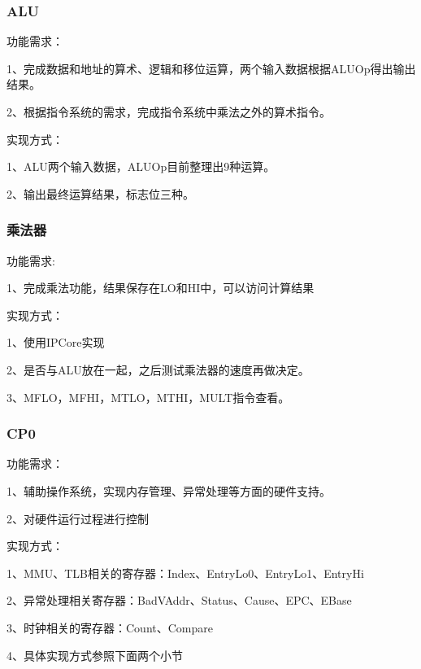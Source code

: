 \documentclass[12pt,a4paper]{article}
\begin{document}
\begin{CJK}{UTF8}{gbsn}
		\subsubsection{ALU}
			\begin{description*}
				\setlength{\itemsep}{1pt}
				\item[\quad 功能需求：]\hfill\par
					1、完成数据和地址的算术、逻辑和移位运算，两个输入数据根据ALUOp得出输出结果。\par
					2、根据指令系统的需求，完成指令系统中乘法之外的算术指令。\par
				\item[\quad 实现方式：]\hfill\par
					1、ALU两个输入数据，ALUOp目前整理出9种运算。\par
					2、输出最终运算结果，标志位三种。\par
			\end{description*}

		\subsubsection{乘法器}
			\begin{description*}
				\setlength{\itemsep}{1pt}
				\item[\quad 功能需求:]\hfill\par
					1、完成乘法功能，结果保存在LO和HI中，可以访问计算结果
				\item[\quad 实现方式：]\hfill\par
					1、使用IPCore实现\par
					2、是否与ALU放在一起，之后测试乘法器的速度再做决定。\par
					3、MFLO，MFHI，MTLO，MTHI，MULT指令查看。
			\end{description*}

		\subsubsection{CP0}
			\begin{description*}
				\setlength{\itemsep}{1pt}
				\item[\quad 功能需求：]\hfill\par
					1、辅助操作系统，实现内存管理、异常处理等方面的硬件支持。\par
					2、对硬件运行过程进行控制
				\item[\quad 实现方式：]\hfill\par
					1、MMU、TLB相关的寄存器：Index、EntryLo0、EntryLo1、EntryHi\par
					2、异常处理相关寄存器：BadVAddr、Status、Cause、EPC、EBase\par
					3、时钟相关的寄存器：Count、Compare\par
					4、具体实现方式参照下面两个小节
			\end{description*}
			

\end{CJK}
\end{document}
